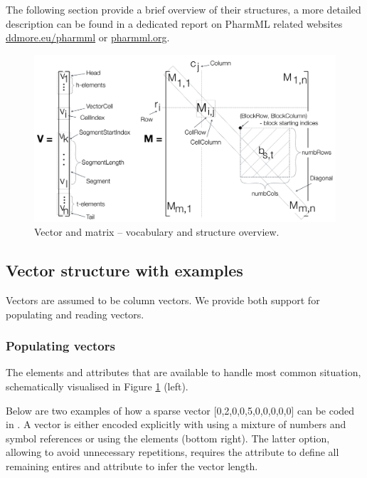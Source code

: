 The following section provide a brief overview of their structures, a more detailed 
description can be found in a dedicated report on PharmML related websites \url{ddmore.eu/pharmml} or 
\url{pharmml.org}.

\begin{figure}[htbp]
\centering
 \includegraphics[width=170mm]{pics/VectorMatrixStructure}
\caption{Vector and matrix -- vocabulary and structure overview.}
\label{fig:vectorMatrix}
\end{figure}



\subsection{Vector structure with examples}
\label{subsec:vectorType}
Vectors are assumed to be column vectors. We provide both support for populating and reading 
vectors. 

\subsubsection{Populating vectors}
The elements and attributes that are available to handle most common situation,
schematically visualised in Figure \ref{fig:vectorMatrix} (left).

Below  are two examples of how a sparse vector [0,2,0,0,5,0,0,0,0,0] can be coded in \pharmml. 
A vector is either 
encoded explicitly with  using a mixture of numbers 
and symbol references or using the  elements (bottom right). 
The latter option, allowing to avoid unnecessary repetitions, requires the 
 attribute to define all remaining entires and  attribute 
to infer the vector length.


